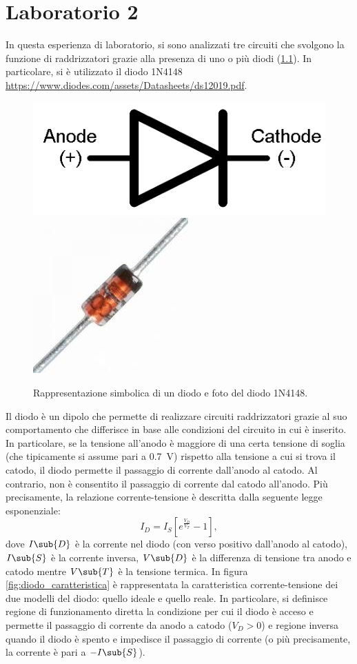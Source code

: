 \chapter{Laboratorio 2}
In questa esperienza di laboratorio, si sono analizzati tre circuiti che svolgono la funzione di raddrizzatori grazie alla presenza di uno o più diodi (\Fig\ref{fig:diodo}). In particolare, si è utilizzato il diodo 1N4148 \url{https://www.diodes.com/assets/Datasheets/ds12019.pdf}.
\begin{figure}[h]
	\centering
	\includegraphics[width=0.25\linewidth]{./ImageFiles/Laboratorio 2/diodo_1}
	\includegraphics[width=0.15\linewidth]{./ImageFiles/Laboratorio 2/diodo_4}
	\caption{Rappresentazione simbolica di un diodo e foto del diodo 1N4148.}
	\label{fig:diodo}
\end{figure}
Il diodo è un dipolo che permette di realizzare circuiti raddrizzatori grazie al suo comportamento che differisce in base alle condizioni del circuito in cui è inserito. In particolare, se la tensione all'anodo è maggiore di una certa tensione di soglia (che tipicamente si assume pari a \SI{0.7}{\volt}) rispetto alla tensione a cui si trova il catodo, il diodo permette il passaggio di corrente dall'anodo al catodo. Al contrario, non è consentito il passaggio di corrente dal catodo all'anodo. Più precisamente, la relazione corrente-tensione è descritta dalla seguente legge esponenziale:
\begin{equation}
	I_D=I_S[e^{\frac{V_D}{V_T}}-1],
\end{equation}
dove $I\sub{D}$ è la corrente nel diodo (con verso positivo dall'anodo al catodo), $I\sub{S}$ è la corrente inversa, $V\sub{D}$ è la differenza di tensione tra anodo e catodo mentre $V\sub{T}$ è la tensione termica. In figura \ref{fig:diodo_caratteristica} è rappresentata la caratteristica corrente-tensione dei due modelli del diodo: quello ideale e quello reale. In particolare, si definisce regione di funzionamento diretta la condizione per cui il diodo è acceso e permette il passaggio di corrente da anodo a catodo ($V_{D}>0$) e regione inversa quando il diodo è spento e impedisce il passaggio di corrente (o più precisamente, la corrente è pari a $-I\sub{S}$).
